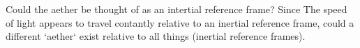 \begin{questions}
	\item Could the aether be thought of as an intertial reference frame? Since The speed of light appears to travel contantly relative to an inertial reference frame, could a different `aether` exist relative to all things (inertial reference frames).
\end{questions}





















